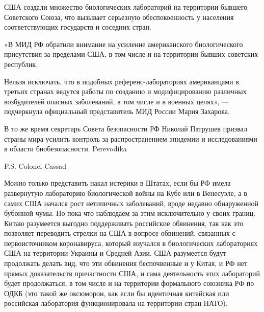 США создали множество биологических лабораторий на территории бывшего
Советского Союза, что вызывает серьезную обеспокоенность у населения
соответствующих государств и соседних стран.

«В МИД РФ обратили внимание на усиление американского биологического
присутствия за пределами США, в том числе и на территории бывших советских
республик.

Нельзя исключать, что в подобных референс-лабораториях американцами в третьих
странах ведутся работы по созданию и модифицированию различных возбудителей
опасных заболеваний, в том числе и в военных целях», — подчеркнула официальный
представитель МИД России Мария Захарова.

В то же время секретарь Совета безопасности РФ Николай Патрушев призвал страны
мира усилить контроль за распространением эпидемии и исследованиями в области
биобезопасности.  Perevodika

P.S. Colonel Cassad

Можно только представить накал истерики в Штатах, если бы РФ имела развернутую
лабораторию биологической войны на Кубе или в Венесуэле, а в самих США начался
рост нетипичных заболеваний, вроде недавно обнаруженной бубонной чумы. Но пока
что наблюдаем за этим исключительно у своих границ.  Китаю разумеется выгодно
поддерживать российские обвинения, так как это позволяет переводить стрелки на
США в вопросе обвинений, связанных с первоисточником коронавируса, который
изучался в биологических лабораториях США на территории Украины и Средней Азии.
США разумеется будут продолжать делать вид, что эти обвинения беспочвенные и у
Китая, и РФ нет прямых доказательств причастности США, и сама деятельность этих
лабораторий будет продолжаться, в том числе и на территории формального
союзника РФ по ОДКБ (это такой же оксюморон, как если бы идентичная китайская
или российская лаборатория функционировала на территории стран НАТО).
  
